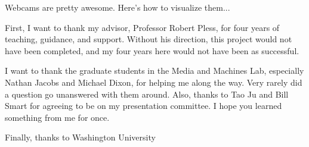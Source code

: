 %

\begin{thesistitlepage}               %
\end{thesistitlepage}

\begin{thesisabstract}
Webcams are pretty awesome.  Here's how to visualize them...
\end{thesisabstract}

\begin{thesisacknowledgments}

First, I want to thank my advisor, Professor Robert Pless, for four years of teaching, guidance, and support.  Without his direction, this project would not have been completed, and my four years here would not have been as successful.

I want to thank the graduate students in the Media and Machines Lab, especially Nathan Jacobs and Michael Dixon, for helping me along the way.  Very rarely did a question go unanswered with them around.  Also, thanks to Tao Ju and Bill Smart for agreeing to be on my presentation committee.  I hope you learned something from me for once.

Finally, thanks to Washington University 

\end{thesisacknowledgments}


\begin{singlespace}
\tableofcontents



\listoffigures
\end{singlespace}

